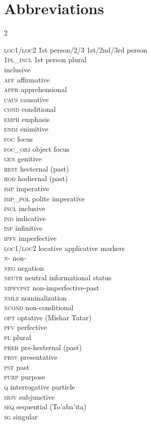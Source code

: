 \documentclass[output=paper,colorlinks,citecolor=brown
]{langscibook}
\begin{document}
\section*{Abbreviations}
\begin{multicols}{2}
\begin{tabbing}
\textsc{loc1/loc2} \= 1st person/2/3 \> 1st/2nd/3rd person \\
1\textsc{pl\_incl} \> 1st person plural \\
{} \> inclusive \\
\textsc{aff} \> affirmative \\
\textsc{appr} \> apprehensional \\
\textsc{caus} \> causative \\
\textsc{cond} \> conditional \\
\textsc{emph} \> emphasis \\
\textsc{enim} \> enimitive \\
\textsc{foc} \> focus \\
\textsc{foc\_obj} \> object focus \\
\textsc{gen} \> genitive \\
\textsc{hest} \> hesternal (past) \\
\textsc{hod} \> hodiernal (past) \\
\textsc{imp} \> imperative \\
\textsc{imp\_pol} \> polite imperative \\
\textsc{incl} \> inclusive\\
\textsc{ind} \> indicative \\
\textsc{inf} \> infinitive \\
\textsc{ipfv} \> imperfective \\
\textsc{loc1/loc2} \> locative applicative markers \\
\textsc{n-} \> non- \\
\textsc{neg} \> negation \\
\textsc{neutr} \> neutral informational status \\
\textsc{nipfvpst} \> non-imperfective-past \\
\textsc{nmlz} \> nominalization \\
\textsc{ncond} \> non-conditional \\
\textsc{opt} \> optative (Mishar Tatar) \\
\textsc{pfv} \> perfective \\
\textsc{pl} \> plural \\
\textsc{preh} \> pre-hesternal (past) \\
\textsc{prsv} \> presentative \\
\textsc{pst} \> past \\
\textsc{purp} \> purpose \\
\textsc{q} \> interrogative particle \\
\textsc{sbjv} \> subjunctive \\
\textsc{seq} \> sequential (To'aba'ita) \\
\textsc{sg} \> singular 
\end{tabbing}
\end{multicols}
\end{document}
